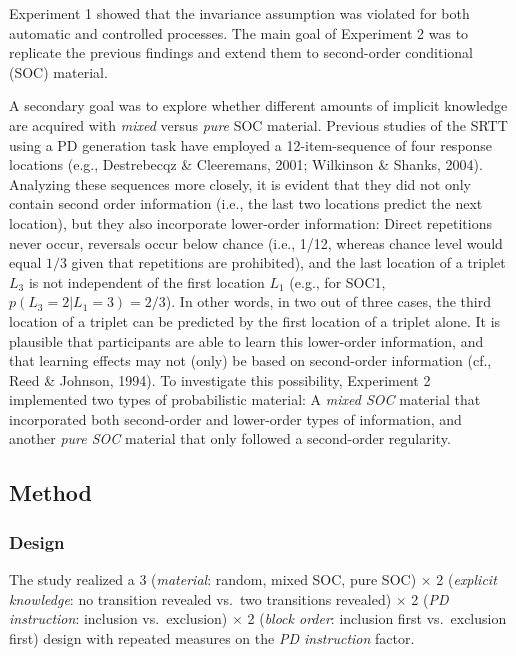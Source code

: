 \documentclass[floatsintext,man]{apa6}
\begin{document}
Experiment 1 showed that the invariance assumption was violated for both
automatic and controlled processes. The main goal of Experiment 2 was to
replicate the previous findings and extend them to second-order
conditional (SOC) material.

A secondary goal was to explore whether different amounts of implicit
knowledge are acquired with \emph{mixed} versus \emph{pure} SOC
material. Previous studies of the SRTT using a PD generation task have
employed a 12-item-sequence of four response locations (e.g.,
Destrebecqz \& Cleeremans, 2001; Wilkinson \& Shanks, 2004). Analyzing
these sequences more closely, it is evident that they did not only
contain second order information (i.e., the last two locations predict
the next location), but they also incorporate lower-order information:
Direct repetitions never occur, reversals occur below chance (i.e.,
1/12, whereas chance level would equal \(1/3\) given that repetitions
are prohibited), and the last location of a triplet \(L_3\) is not
independent of the first location \(L_1\) (e.g., for SOC1,
\(p(L_3 = 2 | L_1 = 3) = 2/3\)). In other words, in two out of three
cases, the third location of a triplet can be predicted by the first
location of a triplet alone. It is plausible that participants are able
to learn this lower-order information, and that learning effects may not
(only) be based on second-order information (cf., Reed \& Johnson,
1994). To investigate this possibility, Experiment 2 implemented two
types of probabilistic material: A \emph{mixed SOC} material that
incorporated both second-order and lower-order types of information, and
another \emph{pure SOC} material that only followed a second-order
regularity.

\subsection{Method}\label{method-1}

\subsubsection{Design}\label{design-1}

The study realized a 3 (\emph{material}: random, mixed SOC, pure SOC)
\(\times\) 2 (\emph{explicit knowledge}: no transition revealed vs.~two
transitions revealed) \(\times\) 2 (\emph{PD instruction}: inclusion
vs.~exclusion) \(\times\) 2 (\emph{block order}: inclusion first
vs.~exclusion first) design with repeated measures on the \emph{PD
instruction} factor.
\end{document}
